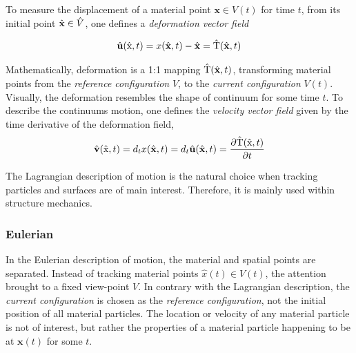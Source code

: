 \newpage
To measure the displacement of a material point $\mathbf{x} \in V(t)$ for time $t$, from its initial point $\hat{\mathbf{x}} \in \hat{V}$, one defines a \textit{deformation vector field} 

\begin{align}
\hat{\mathbf{u}}(\text{\^{x}},t) = x(\hat{\mathbf{x}},t) - \hat{\mathbf{x}} = \text{\^{T}}(\hat{\mathbf{x}}, t) 
\end{align}

Mathematically, deformation is a 1:1 mapping  $\text{\^{T}}(\hat{\mathbf{x}}, t)$, transforming material points from the   \textit{reference configuration} $\hat{V}$, to the  \textit{current configuration} $V(t)$. Visually, the deformation resembles the shape of continuum for some time $t$. To describe the continuums motion, one defines the \textit{velocity vector field} given by the time derivative of the deformation field,
\begin{align}
\hat{\mathbf{v}}(\text{\^{x}},t) = d_t x(\hat{\mathbf{x}},t) = d_t \hat{\mathbf{u}}(\hat{\mathbf{x}},t) = \frac{\partial \text{\^{T}}(\text{\^{x}}, t)}{\partial t} 
\end{align}

The Lagrangian description of motion is the natural choice when tracking particles and surfaces are of main interest. Therefore, it is mainly used within structure mechanics. 

\subsubsection*{Eulerian}
In the Eulerian description of motion, the material and spatial points are separated. Instead of tracking material points $\hat{x}(t) \in V(t)$, the attention brought to a fixed view-point $V$. In contrary with the Lagrangian description, the \textit{current configuration} is chosen as the \textit{reference configuration}, not the initial position of all material particles. The location or velocity of any material particle is not of interest, but rather the properties of a material particle happening to be at  $\mathbf{x}(t)$ for some $t$. 


